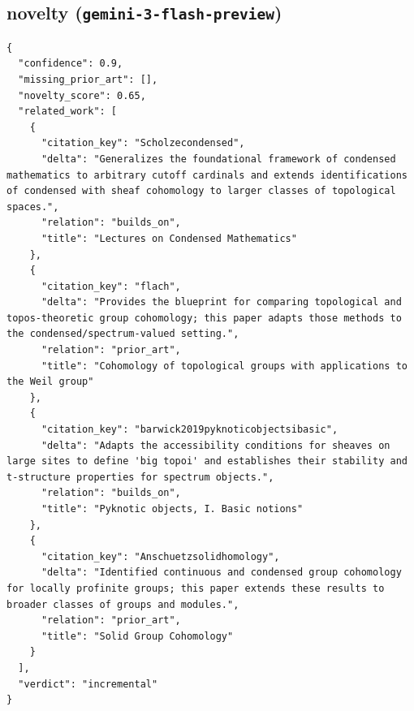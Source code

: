 \documentclass[11pt]{article}
\begin{document}
\subsection*{novelty (\texttt{gemini-3-flash-preview})}
\begin{verbatim}
{
  "confidence": 0.9,
  "missing_prior_art": [],
  "novelty_score": 0.65,
  "related_work": [
    {
      "citation_key": "Scholzecondensed",
      "delta": "Generalizes the foundational framework of condensed mathematics to arbitrary cutoff cardinals and extends identifications of condensed with sheaf cohomology to larger classes of topological spaces.",
      "relation": "builds_on",
      "title": "Lectures on Condensed Mathematics"
    },
    {
      "citation_key": "flach",
      "delta": "Provides the blueprint for comparing topological and topos-theoretic group cohomology; this paper adapts those methods to the condensed/spectrum-valued setting.",
      "relation": "prior_art",
      "title": "Cohomology of topological groups with applications to the Weil group"
    },
    {
      "citation_key": "barwick2019pyknoticobjectsibasic",
      "delta": "Adapts the accessibility conditions for sheaves on large sites to define 'big topoi' and establishes their stability and t-structure properties for spectrum objects.",
      "relation": "builds_on",
      "title": "Pyknotic objects, I. Basic notions"
    },
    {
      "citation_key": "Anschuetzsolidhomology",
      "delta": "Identified continuous and condensed group cohomology for locally profinite groups; this paper extends these results to broader classes of groups and modules.",
      "relation": "prior_art",
      "title": "Solid Group Cohomology"
    }
  ],
  "verdict": "incremental"
}
\end{verbatim}
\end{document}
